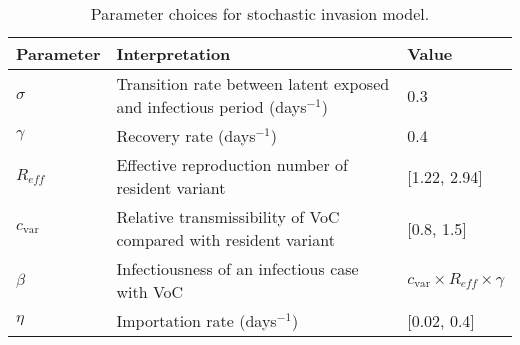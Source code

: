 \documentclass{article}
\begin{document}
\begin{table}[htb] 
\begin{center}
\begin{tabular}{| l | l | l |} \hline
Parameter 	&	Interpretation & Value	\\\hline
$\sigma$	&  Transition rate between latent exposed and infectious period (days$^{-1}$) 	&	0.3 \\\hline
$\gamma$	&	Recovery rate (days$^{-1}$) 	&	0.4\\\hline
$R_{eff}$	& Effective reproduction number of resident variant 	&	[1.22, 2.94] \\\hline
$c_{\text{var}}$	& Relative transmissibility of VoC compared with resident variant 	&  [0.8, 1.5] \\\hline
$\beta$	&	Infectiousness of an infectious case with VoC	&  $c_{\text{var}} \times R_{eff} \times \gamma $\\\hline
$\eta$	&	Importation rate (days$^{-1}$) 	&  [0.02, 0.4] \\\hline
\end{tabular}

\caption{Parameter choices for stochastic invasion model.} 
\label{Table:overall_all} 
\end{center}
\end{table}




\end{document}
